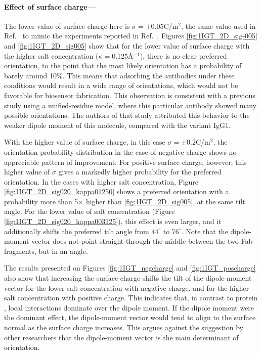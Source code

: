 \medskip
 
 \paragraph*{Effect of surface charge---}
 
The lower value of surface charge here is $\sigma=\pm 0.05$C/m$^2$, the same value used in Ref.~ to mimic the experiments reported in Ref.~. Figures \ref{fig:1IGT_2D_sig-005} and \ref{fig:1IGT_2D_sig005} show that for the lower value of surface charge with the higher salt concentration ($\kappa=0.125$\AA$^{-1}$), there is no clear preferred orientation, to the point that the most likely orientation has a probability of barely around 10\%. This means that adsorbing the antibodies under these conditions would result in a wide range of orientations, which would not be favorable for biosensor fabrication. This observation is consistent with a previous study using a unified-residue model,\cite{ZhouChenJiang2003} where this particular antibody showed many possible orientations. The authors of that study attributed this behavior to the weaker dipole moment of this molecule, compared with the variant IgG1.
 
 With the higher value of surface charge, in this case $\sigma=\pm0.2$C/m$^2$, the orientation probability distribution in the case of negative charge shows no appreciable pattern of improvement.
 For positive surface charge, however, this higher value of $\sigma$ gives a markedly higher probability for the preferred orientation.
In the cases with higher salt concentration, Figure \ref{fig:1IGT_2D_sig020_kappa01250} shows a preferred orientation with a probability more than 5$\times$ higher than \ref{fig:1IGT_2D_sig005}, at the same tilt angle. For the lower value of salt concentration (Figure \ref{fig:1IGT_2D_sig020_kappa003125}), this effect is even larger, and it additionally shifts the preferred tilt angle from $44^{\circ}$ to $76^{\circ}$. Note that the dipole-moment vector does not point straight through the middle between the two Fab fragments, but in an angle.
 
The results presented on Figures \ref{fig:1IGT_negcharge} and \ref{fig:1IGT_poscharge} also show that increasing the surface charge shifts the tilt of the dipole-moment vector for the lower salt concentration with negative charge, and for the higher salt concentration with positive charge. This indicates that, in contrast to protein \gb, local interactions dominate over the dipole moment. If the dipole moment were the dominant effect, the dipole-moment vector would tend to align to the surface normal as the surface charge increases.
This argues against the suggestion by other researchers\cite{ChenLiuZhouJiang2003,ZhouChenJiang2003} that the dipole-moment vector is the main determinant of orientation.
 
